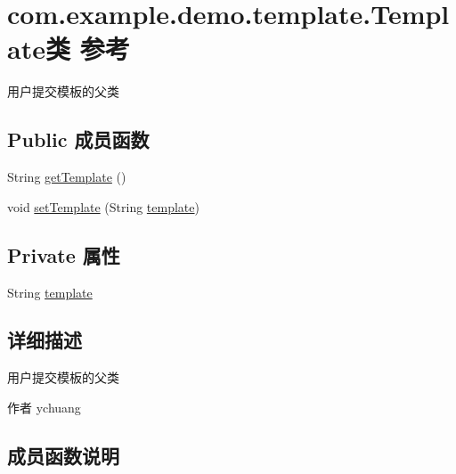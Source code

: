 \hypertarget{classcom_1_1example_1_1demo_1_1template_1_1_template}{}\section{com.\+example.\+demo.\+template.\+Template类 参考}
\label{classcom_1_1example_1_1demo_1_1template_1_1_template}


用户提交模板的父类  


\subsection*{Public 成员函数}
\begin{DoxyCompactItemize}
\item 
String \mbox{\hyperlink{classcom_1_1example_1_1demo_1_1template_1_1_template_a706a75afe48217e61fc0a6b897c11e6d}{get\+Template}} ()
\item 
void \mbox{\hyperlink{classcom_1_1example_1_1demo_1_1template_1_1_template_acea505981f00d7ae593d906700dd46a4}{set\+Template}} (String \mbox{\hyperlink{classcom_1_1example_1_1demo_1_1template_1_1_template_a22c7f4d5717eba277703922ae4fba06c}{template}})
\end{DoxyCompactItemize}
\subsection*{Private 属性}
\begin{DoxyCompactItemize}
\item 
String \mbox{\hyperlink{classcom_1_1example_1_1demo_1_1template_1_1_template_a22c7f4d5717eba277703922ae4fba06c}{template}}
\end{DoxyCompactItemize}


\subsection{详细描述}
用户提交模板的父类 

\begin{DoxyAuthor}{作者}
ychuang 
\end{DoxyAuthor}


\subsection{成员函数说明}
\mbox{\label{classcom_1_1example_1_1demo_1_1template_1_1_template_a706a75afe48217e61fc0a6b897c11e6d}} 

